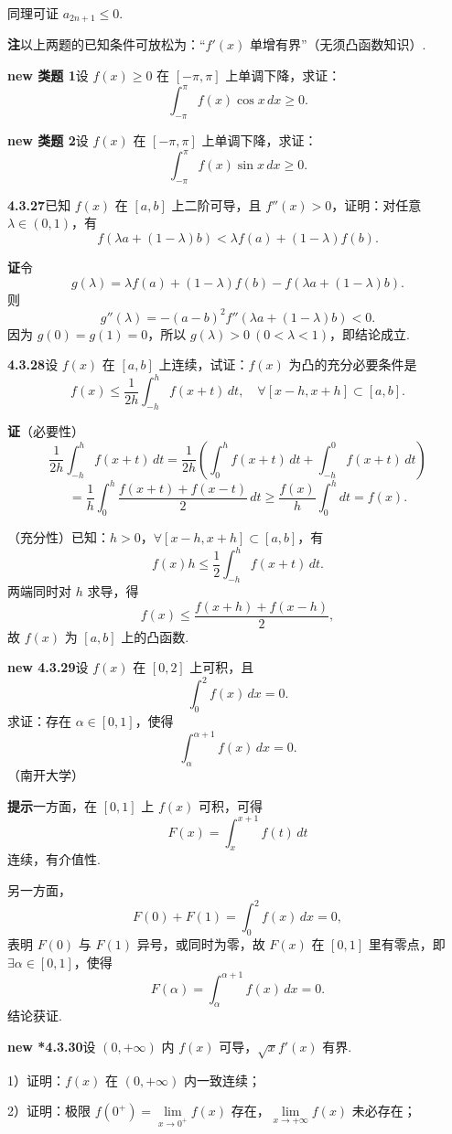 \documentclass[UTF8,12pt,a4paper,fontset=fandol]{ctexart}
\begin{document}
同理可证 $a_{2n+1}\le0$.

\noindent\textbf{注}\quad 以上两题的已知条件可放松为：“$f'(x)$ 单增有界”（无须凸函数知识）.

\noindent\textbf{new 类题 1}\quad 设 $f(x)\ge0$ 在 $[-\pi,\pi]$ 上单调下降，求证：
\[
\int_{-\pi}^{\pi}f(x)\cos x\,dx\ge0.
\]

\noindent\textbf{new 类题 2}\quad 设 $f(x)$ 在 $[-\pi,\pi]$ 上单调下降，求证：
\[
\int_{-\pi}^{\pi}f(x)\sin x\,dx\ge0.
\]

\noindent\textbf{4.3.27}\quad 已知 $f(x)$ 在 $[a,b]$ 上二阶可导，且 $f''(x)>0$，证明：对任意
$\lambda\in(0,1)$，有
\[
f(\lambda a+(1-\lambda)b)<\lambda f(a)+(1-\lambda)f(b).
\]

\noindent\textbf{证}\quad 令
\[
g(\lambda)=\lambda f(a)+(1-\lambda)f(b)-f(\lambda a+(1-\lambda)b).
\]
则
\[
g''(\lambda)=-(a-b)^2f''(\lambda a+(1-\lambda)b)<0.
\]
因为 $g(0)=g(1)=0$，所以 $g(\lambda)>0\ (0<\lambda<1)$，即结论成立.

\noindent\textbf{4.3.28}\quad 设 $f(x)$ 在 $[a,b]$ 上连续，试证：$f(x)$ 为凸的充分必要条件是
\[
f(x)\le\frac1{2h}\int_{-h}^h f(x+t)\,dt,\quad
\forall [x-h,x+h]\subset[a,b].
\]

\noindent\textbf{证}\quad（必要性）
\[
\frac1{2h}\int_{-h}^hf(x+t)\,dt
=\frac1{2h}\left(\int_0^hf(x+t)\,dt+\int_{-h}^0f(x+t)\,dt\right)
\]
\[
=\frac1h\int_0^h\frac{f(x+t)+f(x-t)}2\,dt
\ge\frac{f(x)}h\int_0^hdt=f(x).
\]

（充分性）已知：$h>0$，$\forall [x-h,x+h]\subset[a,b]$，有
\[
f(x)h\le\frac12\int_{-h}^hf(x+t)\,dt.
\]
两端同时对 $h$ 求导，得
\[
f(x)\le\frac{f(x+h)+f(x-h)}2,
\]
故 $f(x)$ 为 $[a,b]$ 上的凸函数.

\noindent\textbf{new 4.3.29}\quad 设 $f(x)$ 在 $[0,2]$ 上可积，且
\[
\int_0^2f(x)\,dx=0.
\]
求证：存在 $\alpha\in[0,1]$，使得
\[
\int_\alpha^{\alpha+1}f(x)\,dx=0.
\]
（南开大学）

\noindent\textbf{提示}\quad 一方面，在 $[0,1]$ 上 $f(x)$ 可积，可得
\[
F(x)=\int_x^{x+1}f(t)\,dt
\]
连续，有介值性.

另一方面，
\[
F(0)+F(1)=\int_0^2f(x)\,dx=0,
\]
表明 $F(0)$ 与 $F(1)$ 异号，或同时为零，故 $F(x)$ 在 $[0,1]$ 里有零点，即
$\exists\alpha\in[0,1]$，使得
\[
F(\alpha)=\int_\alpha^{\alpha+1}f(x)\,dx=0.
\]
结论获证.

\noindent\textbf{new *4.3.30}\quad 设 $(0,+\infty)$ 内 $f(x)$ 可导，$\sqrt{x}f'(x)$ 有界.

1）证明：$f(x)$ 在 $(0,+\infty)$ 内一致连续；

2）证明：极限 $f(0^+)=\lim\limits_{x\to0^+}f(x)$ 存在，$\lim\limits_{x\to+\infty}f(x)$ 未必存在；
\end{document}
